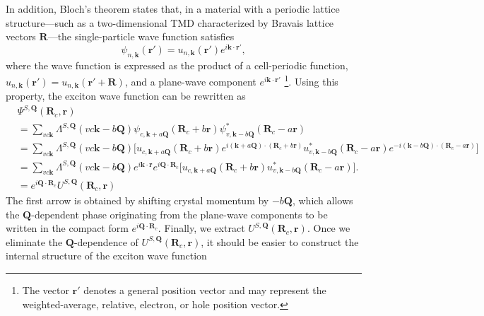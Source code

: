 In addition, Bloch's theorem states that, in a material with a periodic lattice structure---such as a two-dimensional TMD characterized by Bravais lattice vectors $\boldsymbol{R}$---the single-particle wave function satisfies~\cite{griffiths2018introduction, haber2023maximally}
\begin{equation}
\psi_{n,\boldsymbol{k}}(\boldsymbol{r}')
=
u_{n,\boldsymbol{k}}(\boldsymbol{r}')
e^{i\boldsymbol{k}\cdot\boldsymbol{r}'},
\end{equation}
where the wave function is expressed as the product of a cell-periodic function, $u_{n,\boldsymbol{k}}(\boldsymbol{r}')=u_{n,\boldsymbol{k}}(\boldsymbol{r}'+\boldsymbol{R})$, and a plane-wave component $e^{i\boldsymbol{k}\cdot\boldsymbol{r}'}$ \footnote{The vector $\boldsymbol{r}'$ denotes a general position vector and may represent the weighted-average, relative, electron, or hole position vector.}. Using this property, the exciton wave function can be rewritten as
\begin{equation}
\begin{aligned}
&\Psi^{S,\boldsymbol{Q}} (\boldsymbol{R}_c,\boldsymbol{r}) \\
&=
\sum_{vc\boldsymbol{k}}
\Lambda^{S,\boldsymbol{Q}}(vc\boldsymbol{k}-b\boldsymbol{Q})
\psi_{c,\boldsymbol{k}+a\boldsymbol{Q}}(\boldsymbol{R}_c + b\boldsymbol{r})
\psi^{*}_{v,\boldsymbol{k}-b\boldsymbol{Q}}(\boldsymbol{R}_c - a\boldsymbol{r}) \\
&=
\sum_{vc\boldsymbol{k}}
\Lambda^{S,\boldsymbol{Q}}(vc\boldsymbol{k}-b\boldsymbol{Q})
\Big[
u_{c,\boldsymbol{k}+a\boldsymbol{Q}}(\boldsymbol{R}_c+b\boldsymbol{r})
e^{i(\boldsymbol{k}+a\boldsymbol{Q})\cdot(\boldsymbol{R}_c+b\boldsymbol{r})}
u^{*}_{v,\boldsymbol{k}-b\boldsymbol{Q}}(\boldsymbol{R}_c-a\boldsymbol{r})
e^{-i(\boldsymbol{k}-b\boldsymbol{Q})\cdot(\boldsymbol{R}_c-a\boldsymbol{r})}
\Big] \\
&=
\sum_{vc\boldsymbol{k}}
\Lambda^{S,\boldsymbol{Q}}(vc\boldsymbol{k}-b\boldsymbol{Q})
e^{i\boldsymbol{k}\cdot\boldsymbol{r}}
e^{i\boldsymbol{Q}\cdot\boldsymbol{R}_c}
\Big[
u_{c,\boldsymbol{k}+a\boldsymbol{Q}}
(\boldsymbol{R}_c+b\boldsymbol{r})
u^{*}_{v,\boldsymbol{k}-b\boldsymbol{Q}}
(\boldsymbol{R}_c-a\boldsymbol{r})
\Big].\\
&=
e^{i\boldsymbol{Q}\cdot\boldsymbol{R}_c}
U^{S,\boldsymbol{Q}} (\boldsymbol{R}_c,\boldsymbol{r})
\end{aligned}
\label{excitonWF3}
\end{equation}
The first arrow is obtained by shifting crystal momentum by $-b\boldsymbol{Q}$, which allows the $\boldsymbol{Q}$-dependent phase originating from the plane-wave components to be written in the compact form $e^{i\boldsymbol{Q}\cdot\boldsymbol{R}_c}$. Finally, we extract $U^{S,\boldsymbol{Q}} (\boldsymbol{R}_c,\boldsymbol{r})$. Once we eliminate the $\boldsymbol{Q}$-dependence of $U^{S,\boldsymbol{Q}} (\boldsymbol{R}_c,\boldsymbol{r})$, it should be easier to construct the internal structure of the exciton wave function

